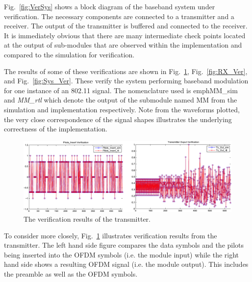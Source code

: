 Fig.~\ref{fig:VerSys} shows a block diagram of the baseband system under verification. The necessary components are connected to a transmitter and a receiver. The output of the transmitter is buffered and connected to the receiver. It is immediately obvious that there are many intermediate check points located at the output of sub-modules that are observed within the implementation and compared to the simulation for verification.

The results of some of these verifications are shown in Fig.~\ref{fig:TX_Ver}, Fig.~\ref{fig:RX_Ver}, and Fig.~\ref{fig:Sys_Ver}.
These verify the system performing baseband modulation for one instance of an 802.11 signal. The nomenclature used is emph{MM\_sim} and \emph{MM\_rtl} which denote the output of the submodule named MM from the simulation and implementation respectively. Note from the waveforms plotted, the very close correspondence of the signal shapes illustrates the underlying correctness of the implementation.


\begin{figure}
	\includegraphics[width=1\columnwidth]{Figures/TX_Verification.pdf}
	\caption{The verification results of the transmitter.}
	\label{fig:TX_Ver}
\end{figure}

To consider more closely, Fig.~\ref{fig:TX_Ver} illustrates verification results from the transmitter. The left hand side figure compares the data symbols and the pilots being inserted into the OFDM symbols (i.e. the module input) while the right hand side shows a resulting OFDM signal (i.e. the module output). This includes the preamble as well as the OFDM symbols.

